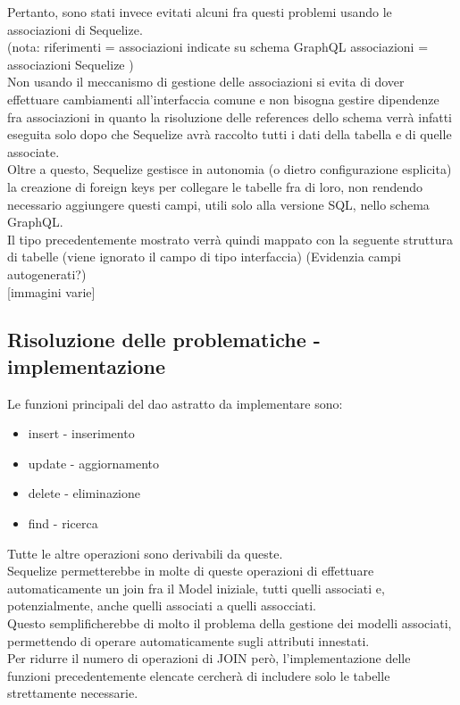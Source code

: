 \documentclass[a4paper, 12pt]{scrartcl}
\begin{document}
      Pertanto, sono stati invece evitati alcuni fra questi problemi usando le associazioni di Sequelize.\\
      (nota: riferimenti = associazioni indicate su schema GraphQL
              associazioni = associazioni Sequelize
      )\\
      Non usando il meccanismo di gestione delle associazioni si evita di dover effettuare cambiamenti all'interfaccia comune e non bisogna gestire dipendenze fra associazioni in quanto la risoluzione delle references dello schema verrà infatti eseguita solo dopo che Sequelize avrà raccolto tutti i dati della tabella e di quelle associate.\\
      Oltre a questo, Sequelize gestisce in autonomia (o dietro configurazione esplicita) la creazione di foreign keys per collegare le tabelle fra di loro, non rendendo necessario aggiungere questi campi, utili solo alla versione SQL, nello schema GraphQL.\\

      Il tipo precedentemente mostrato verrà quindi mappato con la seguente struttura di tabelle (viene ignorato il campo di tipo interfaccia) (Evidenzia campi autogenerati?)\\
      
      [immagini varie]\\
      \newpage
    \subsection*{Risoluzione delle problematiche - implementazione}

      Le funzioni principali del dao astratto da implementare sono:
      \begin{itemize}
        \item insert - inserimento
        \item update - aggiornamento
        \item delete - eliminazione
        \item find - ricerca
      \end{itemize}
      Tutte le altre operazioni sono derivabili da queste.\\
      Sequelize permetterebbe in molte di queste operazioni di effettuare automaticamente un join fra il Model iniziale, tutti quelli associati e, potenzialmente, anche quelli associati a quelli assocciati.\\
      Questo semplificherebbe di molto il problema della gestione dei modelli associati, permettendo di operare automaticamente sugli attributi innestati.\\
      Per ridurre il numero di operazioni di JOIN però, l'implementazione delle funzioni precedentemente elencate cercherà di includere solo le tabelle strettamente necessarie.\\
\end{document}
